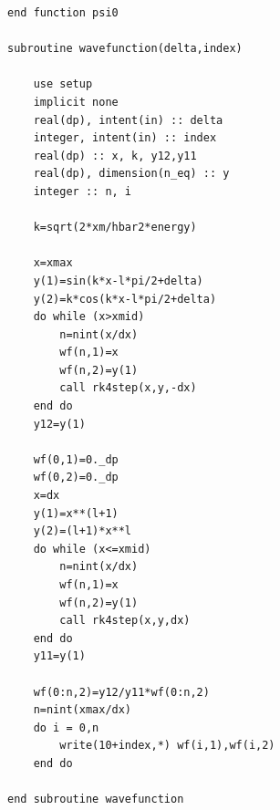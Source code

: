 \documentclass[12pt]{article}
\begin{document}
\begin{lstlisting}[frame=single,caption={ {\tt ho1d10.f95}},label=module]
end function psi0

subroutine wavefunction(delta,index)

    use setup
    implicit none
    real(dp), intent(in) :: delta
    integer, intent(in) :: index
    real(dp) :: x, k, y12,y11
    real(dp), dimension(n_eq) :: y
    integer :: n, i
    
    k=sqrt(2*xm/hbar2*energy)

    x=xmax
    y(1)=sin(k*x-l*pi/2+delta)
    y(2)=k*cos(k*x-l*pi/2+delta)
    do while (x>xmid)
        n=nint(x/dx)
        wf(n,1)=x
        wf(n,2)=y(1)
        call rk4step(x,y,-dx)
    end do
    y12=y(1)

    wf(0,1)=0._dp
    wf(0,2)=0._dp
    x=dx
    y(1)=x**(l+1)
    y(2)=(l+1)*x**l
    do while (x<=xmid)
        n=nint(x/dx)
        wf(n,1)=x
        wf(n,2)=y(1)
        call rk4step(x,y,dx)
    end do
    y11=y(1)

    wf(0:n,2)=y12/y11*wf(0:n,2)
    n=nint(xmax/dx)
    do i = 0,n
        write(10+index,*) wf(i,1),wf(i,2)
    end do

end subroutine wavefunction


\end{lstlisting}
\end{document}

